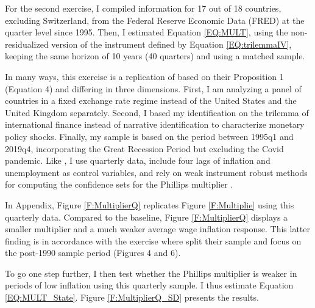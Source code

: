 \documentclass[12pt]{article}
\begin{document}
For the second exercise, I compiled information for 17 out of 18 countries, excluding Switzerland, from the Federal Reserve Economic Data (FRED) at the quarter level since 1995. Then, I estimated Equation \eqref{EQ:MULT}, using the non-residualized version of the instrument defined by Equation \eqref{EQ:trilemmaIV}, keeping the same horizon of 10 years (40 quarters) and using a matched sample.

In many ways, this exercise is a replication of \cite{Barnichon2019} based on their Proposition 1 (Equation 4) and differing in three dimensions. First, I am analyzing a panel of countries in a fixed exchange rate regime instead of the United States and the United Kingdom separately. Second, I based my identification on the trilemma of international finance instead of narrative identification to characterize monetary policy shocks. Finally, my sample is based on the period between 1995q1 and 2019q4, incorporating the Great Recession Period but excluding the Covid pandemic. Like \cite{Barnichon2019}, I use quarterly data, include four lags of inflation and unemployment as control variables, and rely on weak instrument robust methods for computing the confidence sets for the Phillips multiplier \citep{Anderson1949}.

In Appendix, Figure \ref{F:MultiplierQ} replicates Figure \ref{F:Multiplie} using this quarterly data. Compared to the baseline, Figure \ref{F:MultiplierQ} displays a smaller multiplier and a much weaker average wage inflation response. This latter finding is in accordance with the exercise where \cite{Barnichon2019} split their sample and focus on the post-1990 sample period (Figures 4 and 6).


To go one step further, I then test whether the Phillips multiplier is weaker in periods of low inflation using this quarterly sample. I thus estimate Equation \eqref{EQ:MULT_State}. Figure \ref{F:MultiplierQ_SD} presents the results.
\end{document}
